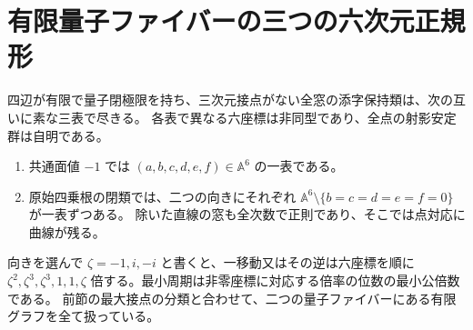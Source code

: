 \section{有限量子ファイバーの三つの六次元正規形}
\label{sec:finite-quantum-planar-fibers}
\begin{theorem}\label{thm:finite-quantum-planar-fibers}
四辺が有限で量子閉極限を持ち、三次元接点がない全窓の添字保持類は、次の互いに素な三表で尽きる。
各表で異なる六座標は非同型であり、全点の射影安定群は自明である。
\begin{enumerate}
\item 共通面値 $-1$ では $(a,b,c,d,e,f)\in\mathbb A^6$ の一表である。
\item 原始四乗根の閉類では、二つの向きにそれぞれ
$\mathbb A^6\setminus\{b=c=d=e=f=0\}$ が一表ずつある。
除いた直線の窓も全次数で正則であり、そこでは点対応に曲線が残る。
\end{enumerate}
向きを選んで $\zeta=-1,i,-i$ と書くと、一移動又はその逆は六座標を順に
$\zeta^{2},\zeta^{3},\zeta^{3},1,1,\zeta$ 倍する。最小周期は非零座標に対応する倍率の位数の最小公倍数である。
前節の最大接点の分類と合わせて、二つの量子ファイバーにある有限グラフを全て扱っている。
\end{theorem}
